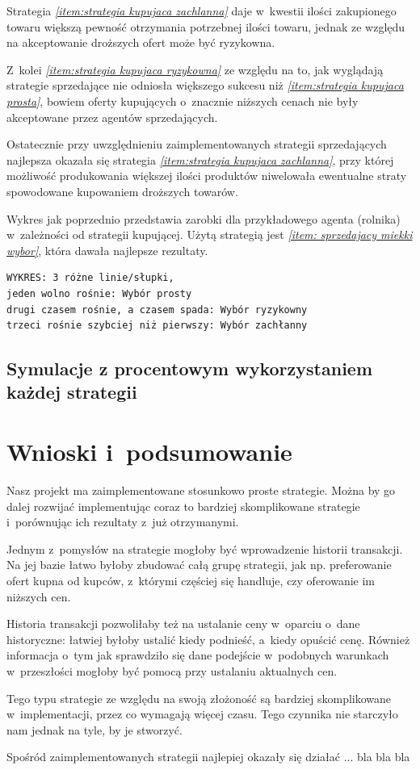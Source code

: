 \documentclass[12pt]{article}
\begin{document}
Strategia \emph{\ref{item:strategia kupujaca zachlanna}} daje w~kwestii ilości zakupionego towaru większą pewność otrzymania potrzebnej ilości towaru, jednak ze względu na akceptowanie droższych ofert może być ryzykowna.

Z~kolei \emph{\ref{item:strategia kupujaca ryzykowna}} ze względu na to, jak wyglądają strategie sprzedające nie odniosła większego sukcesu niż \emph{\ref{item:strategia kupujaca prosta}}, bowiem oferty kupujących
o~znacznie niższych cenach nie były akceptowane przez agentów sprzedających.

Ostatecznie przy uwzględnieniu zaimplementowanych strategii sprzedających najlepsza okazała się strategia \emph{\ref{item:strategia kupujaca zachlanna}}, przy której możliwość produkowania większej ilości produktów
niwelowała ewentualne straty spowodowane kupowaniem droższych towarów.

Wykres jak poprzednio przedstawia zarobki dla przykładowego agenta (rolnika) w~zależności od strategii kupującej. Użytą strategią jest \emph{\ref{item: sprzedajacy miekki wybor}}, która dawała najlepsze rezultaty.

\begin{verbatim}
WYKRES: 3 różne linie/słupki, 
jeden wolno rośnie: Wybór prosty
drugi czasem rośnie, a czasem spada: Wybór ryzykowny
trzeci rośnie szybciej niż pierwszy: Wybór zachłanny 
\end{verbatim}

\subsection{Symulacje z procentowym wykorzystaniem każdej strategii}

\section{Wnioski i~podsumowanie}
Nasz projekt ma zaimplementowane stosunkowo proste strategie. Można by go dalej rozwijać implementując coraz to bardziej skomplikowane strategie i~porównując ich rezultaty z~już otrzymanymi.

Jednym z~pomysłów na strategie mogłoby być wprowadzenie historii transakcji. Na jej bazie łatwo byłoby zbudować całą grupę strategii, jak np. preferowanie ofert kupna od kupców, z~którymi częściej się handluje, czy
oferowanie im niższych cen.

Historia transakcji pozwoliłaby też na ustalanie ceny w~oparciu o~dane historyczne: łatwiej byłoby ustalić kiedy podnieść, a~kiedy opuścić cenę. Również informacja o~tym jak sprawdziło się dane podejście w~podobnych
warunkach w~przeszłości mogłoby być pomocą przy ustalaniu aktualnych cen.

Tego typu strategie ze względu na swoją złożoność są bardziej skomplikowane w~implementacji, przez co wymagają więcej czasu. Tego czynnika nie starczyło nam jednak na tyle, by je stworzyć.

Spośród zaimplementowanych strategii najlepiej okazały się działać ... bla bla bla
\end{document}
